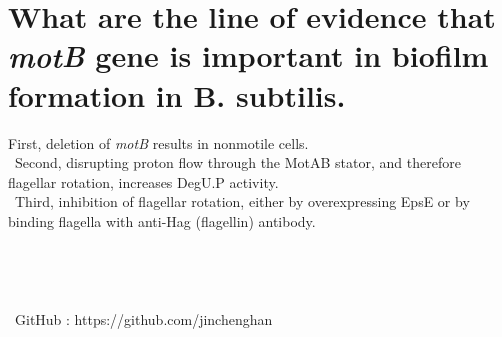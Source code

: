 \documentclass[12pt]{article}%
\begin{document}
\section{What are the line of evidence that \textit{motB} gene is important in biofilm formation in  B. subtilis.  
}
First, deletion of \textit{motB} results in nonmotile cells.\\\
Second, disrupting proton flow through the MotAB
stator, and therefore flagellar rotation, increases DegU.P activity.\\\
Third, inhibition of flagellar rotation, either
by overexpressing EpsE or by binding flagella with anti-Hag (flagellin) antibody.
\\\
\\\
\\\
\\\
\\\
GitHub : https://github.com/jinchenghan
\end{document}
